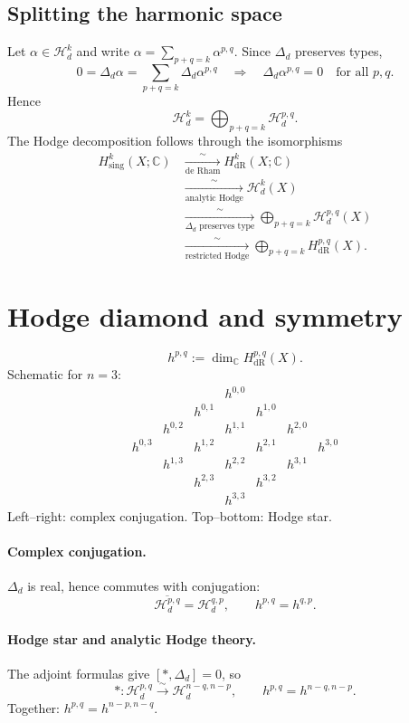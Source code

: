 \documentclass[11pt]{article}
\newcommand{\C}{\mathbb C}
\newcommand{\Hd}{\mathcal H_d}
\newcommand{\dR}{\mathrm{dR}}
\begin{document}
\subsection*{Splitting the harmonic space}
Let $\alpha\in\Hd^k$ and write
$\alpha=\sum_{p+q=k}\alpha^{p,q}$. Since $\Delta_d$ preserves types,
\[
 0=\Delta_d\alpha=\sum_{p+q=k}\Delta_d\alpha^{p,q}
 \quad\Longrightarrow\quad
 \Delta_d\alpha^{p,q}=0\quad\text{for all }p,q.
\]
Hence
\[
 \Hd^k=\bigoplus_{p+q=k}\Hd^{p,q}.
\]
The Hodge decomposition follows through the isomorphisms
\begin{align*}
 H^k_{\mathrm{sing}}(X;\C)
 &\xrightarrow[\text{de Rham}]{\sim}H^k_{\dR}(X;\C)\\
 &\xrightarrow[\text{analytic Hodge}]{\sim}\Hd^k(X)\\
 &\xrightarrow[\Delta_d\text{ preserves type}]{\sim}
   \bigoplus_{p+q=k}\Hd^{p,q}(X)\\
 &\xrightarrow[\text{restricted Hodge}]{\sim}
   \bigoplus_{p+q=k}H^{p,q}_{\dR}(X).
\end{align*}

\section*{Hodge diamond and symmetry}
\[
 h^{p,q}:=\dim_{\C}H^{p,q}_{\dR}(X).
\]
Schematic for $n=3$:
\[
\begin{array}{ccccccc}
 &&&h^{0,0}&&&\\
 &&h^{0,1}&&h^{1,0}&&\\
 &h^{0,2}&&h^{1,1}&&h^{2,0}&\\
 h^{0,3}&&h^{1,2}&&h^{2,1}&&h^{3,0}\\
 &h^{1,3}&&h^{2,2}&&h^{3,1}&\\
 &&h^{2,3}&&h^{3,2}&&\\
 &&&h^{3,3}&&&
\end{array}
\]
Left--right: complex conjugation. Top--bottom: Hodge star.

\paragraph{Complex conjugation.}
$\Delta_d$ is real, hence commutes with conjugation:
\[
 \overline{\Hd^{p,q}}=\Hd^{q,p},\qquad h^{p,q}=h^{q,p}.
\]
\paragraph{Hodge star and analytic Hodge theory.}
The adjoint formulas give $[*,\Delta_d]=0$, so
\[
 *:\Hd^{p,q}\xrightarrow{\sim}\Hd^{n-q,n-p},\qquad
 h^{p,q}=h^{n-q,n-p}.
\]
Together: $h^{p,q}=h^{n-p,n-q}$.
\end{document}

